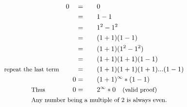 \begin{alignat*}{5}
&\,&0\quad&=\quad&&0\\
&\,&\,&=&&1-1\\
&\,&\,&=&&1^2-1^2\\
&\,&\,&=&&(1+1)(1-1)\\
&\,&\,&=&&(1+1)(1^2-1^2)\\
&\,&\,&=&&(1+1)(1+1)(1-1)\\
&\small\text{repeat the last term}&\,&=&&(1+1)(1+1)(1+1)...(1-1)\\
&\,&0&=&&(1+1)^\infty*(1-1)\\
&\qquad\qquad\small\text{Thus}\normalsize\quad&0&=&&2^\infty*0\quad\small\text{(valid proof)}\\
&\rlap{\qquad\qquad\small\text{Any number being a multiple of 2 is always even.}}
\end{alignat*}
